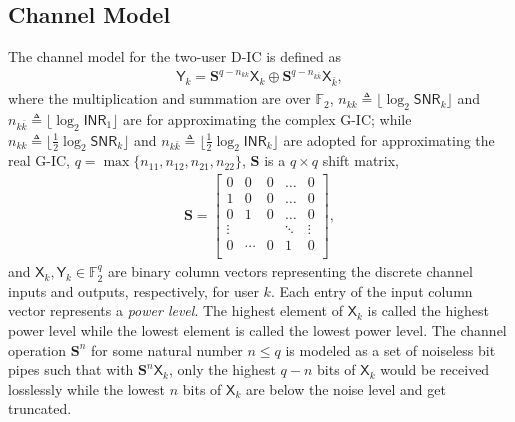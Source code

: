 \documentclass[12pt, draftclsnofoot, onecolumn]{IEEEtran}
\newcommand{\msf}[1]{\mathsf{#1}}
\newcommand{\SNR}{\msf{SNR}}
\newcommand{\INR}{\msf{INR}}
\theoremstyle{definition}
\begin{document}
\subsection{Channel Model}\label{sec:DIC_model}
The channel model for the two-user D-IC is defined as \cite{doi:10.1002/ett.1287}
\begin{align}\label{eq:DIC_model}
\msf{Y}_k = \boldsymbol{S}^{q-n_{kk}}\msf{X}_k \oplus \boldsymbol{S}^{q-n_{k\bar{k}}}\msf{X}_{\bar{k}},
\end{align}
where the multiplication and summation are over $\mathbb{F}_2$, $n_{kk} \triangleq \lfloor\log_2\SNR_k\rfloor$ and $n_{k\bar{k}} \triangleq \lfloor\log_2\INR_1\rfloor$ are for approximating the complex G-IC; while $n_{kk} \triangleq \lfloor\frac{1}{2}\log_2\SNR_k\rfloor$ and $n_{k\bar{k}} \triangleq \lfloor\frac{1}{2}\log_2\INR_k\rfloor$ are adopted for approximating the real G-IC, $q=\max\{n_{11},n_{12},n_{21},n_{22}\}$, $\boldsymbol{S}$ is a $q \times q$ shift matrix,
\begin{align}
\boldsymbol{S}=\begin{bmatrix}
0 & 0 & 0 & \ldots & 0 \\
1 & 0 & 0 & \ldots & 0 \\
0 & 1 & 0 & \ldots & 0 \\
\vdots & & & \ddots & \vdots\\
0 & \cdots & 0 & 1 & 0\\
\end{bmatrix},
\end{align}
and $\msf{X}_k,\msf{Y}_k \in \mathbb{F}_2^q$ are binary column vectors representing the discrete channel inputs and outputs, respectively, for user $k$. Each entry of the input column vector represents a \emph{power level}. The highest element of $\msf{X}_k$ is called the highest power level while the lowest element is called the lowest power level. The channel operation $\boldsymbol{S}^n$ for some natural number $n\leq q$ is modeled as a set of noiseless bit pipes such that with $\boldsymbol{S}^n\msf{X}_k$, only the highest $q-n$ bits of $\msf{X}_k$ would be received losslessly while the lowest $n$ bits of $\msf{X}_k$ are below the noise level and get truncated.
\end{document}
